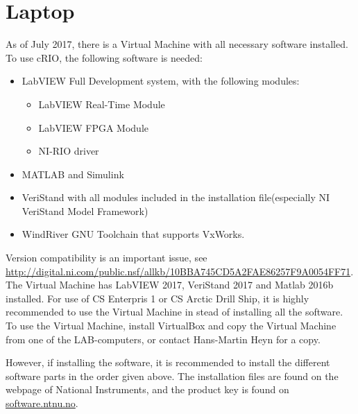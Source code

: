 \documentclass[a4paper,english]{report}
\begin{document}
\section{Laptop}
As of July 2017, there is a Virtual Machine with all necessary software installed. To use cRIO, the following software is needed: 
\begin{itemize}
	\item LabVIEW Full Development system, with the following modules: 
	\begin{itemize}
		\item LabVIEW Real-Time Module
		\item LabVIEW FPGA Module
		\item NI-RIO driver
	\end{itemize}
	\item MATLAB and Simulink
	\item VeriStand with all modules included in the installation file(especially NI VeriStand Model Framework)
	\item WindRiver GNU Toolchain that supports VxWorks. 
\end{itemize}
Version compatibility is an important issue, see \url{http://digital.ni.com/public.nsf/allkb/10BBA745CD5A2FAE86257F9A0054FF71}. The Virtual Machine has LabVIEW 2017, VeriStand 2017 and Matlab 2016b installed. For use of CS Enterpris 1 or CS Arctic Drill Ship, it is highly recommended to use the Virtual Machine in stead of installing all the software. To use the Virtual Machine, install VirtualBox and copy the Virtual Machine from one of the LAB-computers, or contact Hans-Martin Heyn for a copy. 

However, if installing the software, it is recommended to install the different software parts in the order given above. The installation files are found on the webpage of National Instruments, and the product key is found on \url{software.ntnu.no}. 
\end{document}
